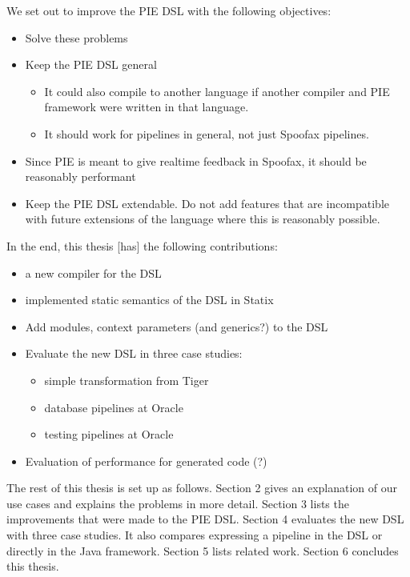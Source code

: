 We set out to improve the PIE DSL with the following objectives:
\begin{itemize}
  \item Solve these problems
  \item Keep the PIE DSL general
  \begin{itemize}
    \item It could also compile to another language if another compiler and PIE framework were written in that language.
    \item It should work for pipelines in general, not just Spoofax pipelines.
  \end{itemize}
  \item Since PIE is meant to give realtime feedback in Spoofax, it should be reasonably performant
  \item Keep the PIE DSL extendable. Do not add features that are incompatible with future extensions of the language where this is reasonably possible.
\end{itemize}

In the end, this thesis [has]  the following contributions:
\begin{itemize}
  \item a new compiler for the DSL
  \item implemented static semantics of the DSL in Statix
  \item Add modules, context parameters (and generics?) to the DSL
  \item Evaluate the new DSL in three case studies:
  \begin{itemize}
    \item simple transformation from Tiger
    \item database pipelines at Oracle
    \item testing pipelines at Oracle
  \end{itemize}
  \item Evaluation of performance for generated code (?)
\end{itemize}

The rest of this thesis is set up as follows.
Section 2 gives an explanation of our use cases and explains the problems in more detail.
Section 3 lists the improvements that were made to the PIE DSL.
Section 4 evaluates the new DSL with three case studies.
It also compares expressing a pipeline in the DSL or directly in the Java framework.
Section 5 lists related work. 
Section 6 concludes this thesis.
